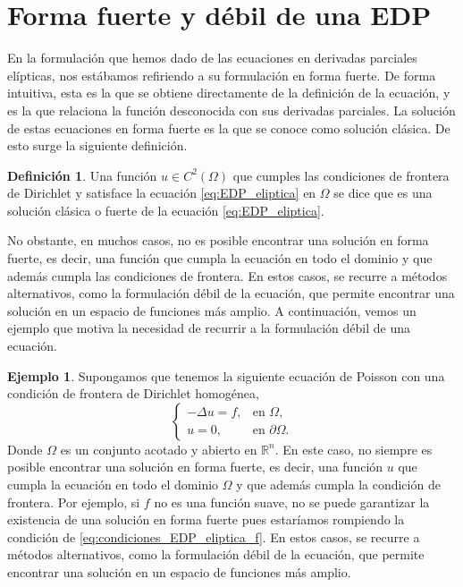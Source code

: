 \documentclass[a4paper,11pt,spanish, twoside, leqno]{tfg-uam}
\theoremstyle{definition}
\newtheorem{defin}[teor]{Definici\'on}
\newtheorem{exmp}[teor]{Ejemplo}
\begin{document}
\section{Forma fuerte y débil de una EDP}
En la formulación que hemos dado de las ecuaciones en derivadas parciales elípticas, nos estábamos refiriendo a su formulación en forma fuerte. De forma intuitiva, esta es la que se obtiene directamente de la definición de la ecuación, y es la que relaciona la función desconocida con sus derivadas parciales. La solución de estas ecuaciones en forma fuerte es la que se conoce como solución clásica. De esto surge la siguiente definición.

\begin{mdframed}
\begin{defin}
    Una función $u \in C^2(\Omega)$ que cumples las condiciones de frontera de Dirichlet y satisface la ecuación \eqref{eq:EDP_eliptica} en $\Omega$ se dice que es una solución clásica o fuerte de la ecuación \eqref{eq:EDP_eliptica}. 
\end{defin}
\end{mdframed}

No obstante, en muchos casos, no es posible encontrar una solución en forma fuerte, es decir, una función que cumpla la ecuación en todo el dominio y que además cumpla las condiciones de frontera. En estos casos, se recurre a métodos alternativos, como la formulación débil de la ecuación, que permite encontrar una solución en un espacio de funciones más amplio. A continuación, vemos un ejemplo que motiva la necesidad de recurrir a la formulación débil de una ecuación.

\begin{exmp}
    Supongamos que tenemos la siguiente ecuación de Poisson con una condición de frontera de Dirichlet homogénea,
    \begin{equation*}
        \begin{cases}
            -\Delta u = f, & \text{en } \Omega,
            \\
            u = 0, & \text{en } \partial\Omega.
        \end{cases}
    \end{equation*}
    Donde $\Omega$ es un conjunto acotado y abierto en $\mathbb{R}^n$. En este caso, no siempre es posible encontrar una solución en forma fuerte, es decir, una función $u$ que cumpla la ecuación en todo el dominio $\Omega$ y que además cumpla la condición de frontera. Por ejemplo, si $f$ no es una función suave, no se puede garantizar la existencia de una solución en forma fuerte pues estaríamos rompiendo la condición de \eqref{eq:condiciones_EDP_eliptica_f}. En estos casos, se recurre a métodos alternativos, como la formulación débil de la ecuación, que permite encontrar una solución en un espacio de funciones más amplio. 
\end{exmp}
\end{document}
